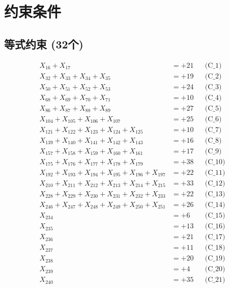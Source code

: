 \documentclass[a4paper,10pt]{article}
\begin{document}
\section{约束条件}

\subsection{等式约束 (32个)}

\allowdisplaybreaks
{\small
\begin{align}
X_{16} + X_{17} &= +21 && \text{(C\_1)} \\
X_{32} + X_{33} + X_{34} + X_{35} &= +19 && \text{(C\_2)} \\
X_{50} + X_{51} + X_{52} + X_{53} &= +24 && \text{(C\_3)} \\
X_{68} + X_{69} + X_{70} + X_{71} &= +10 && \text{(C\_4)} \\
X_{86} + X_{87} + X_{88} + X_{89} &= +27 && \text{(C\_5)} \\
\allowbreak
X_{104} + X_{105} + X_{106} + X_{107} &= +25 && \text{(C\_6)} \\
X_{121} + X_{122} + X_{123} + X_{124} + X_{125} &= +10 && \text{(C\_7)} \\
X_{139} + X_{140} + X_{141} + X_{142} + X_{143} &= +16 && \text{(C\_8)} \\
X_{157} + X_{158} + X_{159} + X_{160} + X_{161} &= +17 && \text{(C\_9)} \\
X_{175} + X_{176} + X_{177} + X_{178} + X_{179} &= +38 && \text{(C\_10)} \\
\allowbreak
X_{192} + X_{193} + X_{194} + X_{195} + X_{196} + X_{197} &= +22 && \text{(C\_11)} \\
X_{210} + X_{211} + X_{212} + X_{213} + X_{214} + X_{215} &= +33 && \text{(C\_12)} \\
X_{228} + X_{229} + X_{230} + X_{231} + X_{232} + X_{233} &= +22 && \text{(C\_13)} \\
X_{246} + X_{247} + X_{248} + X_{249} + X_{250} + X_{251} &= +26 && \text{(C\_14)} \\
X_{234} &= +6 && \text{(C\_15)} \\
\allowbreak
X_{235} &= +13 && \text{(C\_16)} \\
X_{236} &= +21 && \text{(C\_17)} \\
X_{237} &= +11 && \text{(C\_18)} \\
X_{238} &= +20 && \text{(C\_19)} \\
X_{239} &= +4 && \text{(C\_20)} \\
\allowbreak
X_{240} &= +35 && \text{(C\_21)} \\

\end{align}}
\end{document}
